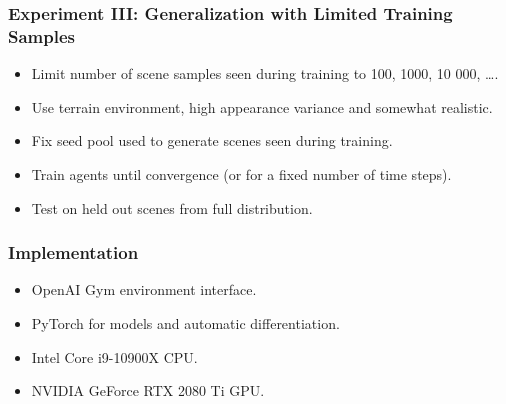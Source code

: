 \begin{frame}
    \frametitle{Experiment III: Generalization with Limited Training Samples}

    \begin{itemize}
        \item Limit number of scene samples seen during training to 100, 1000, 10 000, \dots.
        \item Use terrain environment, high appearance variance and somewhat realistic.
        \item Fix seed pool used to generate scenes seen during training.
        \item Train agents until convergence (or for a fixed number of time steps).
        \item Test on held out scenes from full distribution. 
    \end{itemize}
\end{frame}

\begin{frame}
    \frametitle{Implementation}

    \begin{itemize}
        \item OpenAI Gym environment interface.
        \item PyTorch for models and automatic differentiation.
        \item Intel Core i9-10900X CPU.
        \item NVIDIA GeForce RTX 2080 Ti GPU.
    \end{itemize}
\end{frame}